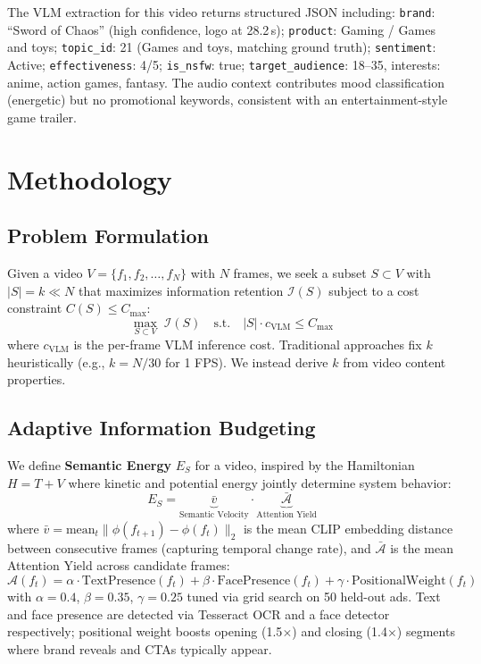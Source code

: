 \documentclass[sigconf,nonacm]{acmart}
\begin{document}
The VLM extraction for this video returns structured JSON including: \texttt{brand}: ``Sword of Chaos'' (high confidence, logo at 28.2\,s); \texttt{product}: Gaming / Games and toys; \texttt{topic\_id}: 21 (Games and toys, matching ground truth); \texttt{sentiment}: Active; \texttt{effectiveness}: 4/5; \texttt{is\_nsfw}: true; \texttt{target\_audience}: 18--35, interests: anime, action games, fantasy. The audio context contributes mood classification (energetic) but no promotional keywords, consistent with an entertainment-style game trailer.

\section{Methodology}
\label{sec:methodology}

\subsection{Problem Formulation}

Given a video $V = \{f_1, f_2, \ldots, f_N\}$ with $N$ frames, we seek a subset $S \subset V$ with $|S| = k \ll N$ that maximizes information retention $\mathcal{I}(S)$ subject to a cost constraint $C(S) \leq C_{\max}$:
\begin{equation}
\label{eq:optimization}
\max_{S \subset V} \; \mathcal{I}(S) \quad \text{s.t.} \quad |S| \cdot c_{\text{VLM}} \leq C_{\max}
\end{equation}
where $c_{\text{VLM}}$ is the per-frame VLM inference cost. Traditional approaches fix $k$ heuristically (e.g., $k = N/30$ for 1 FPS). We instead derive $k$ from video content properties.

\subsection{Adaptive Information Budgeting}
\label{sec:budget}

We define \textbf{Semantic Energy} $E_S$ for a video, inspired by the Hamiltonian $H = T + V$ where kinetic and potential energy jointly determine system behavior:
\begin{equation}
\label{eq:semantic_energy}
E_S = \underbrace{\bar{v}}_{\text{Semantic Velocity}} \cdot \underbrace{\bar{\mathcal{A}}}_{\text{Attention Yield}}
\end{equation}
where $\bar{v} = \text{mean}_t \|\phi(f_{t+1}) - \phi(f_t)\|_2$ is the mean CLIP embedding distance between consecutive frames (capturing temporal change rate), and $\bar{\mathcal{A}}$ is the mean Attention Yield across candidate frames:
\begin{equation}
\label{eq:attention_yield}
\mathcal{A}(f_t) = \alpha \cdot \text{TextPresence}(f_t) + \beta \cdot \text{FacePresence}(f_t) + \gamma \cdot \text{PositionalWeight}(f_t)
\end{equation}
with $\alpha = 0.4$, $\beta = 0.35$, $\gamma = 0.25$ tuned via grid search on 50 held-out ads. Text and face presence are detected via Tesseract OCR and a face detector respectively; positional weight boosts opening (1.5$\times$) and closing (1.4$\times$) segments where brand reveals and CTAs typically appear.
\end{document}
